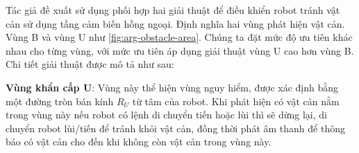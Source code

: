 Tác giả đề xuất sử dụng phối hợp hai giải thuật để điều khiển robot tránh vật cản sử dụng tầng cảm biến hồng ngoại. Định nghĩa hai vùng phát hiện vật cản. Vùng B và vùng U như \figurename{ \ref{fig:arg-obstacle-area}}. Chúng ta đặt mức độ ưu tiên khác nhau cho từng vùng, với mức ưu tiên áp dụng giải thuật vùng U cao hơn vùng B. Chi tiết giải thuật được mô tả như sau:

\textbf{Vùng khẩn cấp U}:
Vùng này thể hiện vùng nguy hiểm, được xác định bằng một đường tròn bán kính ${R}_{U}$ từ tâm của robot. Khi phát hiện có vật cản nằm trong vùng này nếu robot có lệnh di chuyển tiến hoặc lùi thì sẽ dừng lại, di chuyển robot lùi/tiến để tránh khỏi vật cản, đồng thời phát âm thanh để thông báo có vật cản cho đến khi không còn vật cản trong vùng này.

